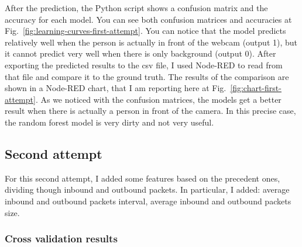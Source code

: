 \documentclass[12pt, conference]{IEEEtran}
\begin{document}
After the prediction, the Python script shows a confusion matrix and the accuracy for each model. You can see both confusion matrices and accuracies at Fig.~\ref{fig:learning-curves-first-attempt}. You can notice that the model predicts relatively well when the person is actually in front of the webcam (output 1), but it cannot predict very well when there is only background (output 0). After exporting the predicted results to the csv file, I used Node-RED to read from that file and compare it to the ground truth. The results of the comparison are shown in a Node-RED chart, that I am reporting here at Fig.~\ref{fig:chart-first-attempt}. As we noticed with the confusion matrices, the models get a better result when there is actually a person in front of the camera. In this precise case, the random forest model is very dirty and not very useful.

\subsection{Second attempt}
For this second attempt, I added some features based on the precedent ones, dividing though inbound and outbound packets. In particular, I added: average inbound and outbound packets interval, average inbound and outbound packets size.

\subsubsection{Cross validation results}
\end{document}
